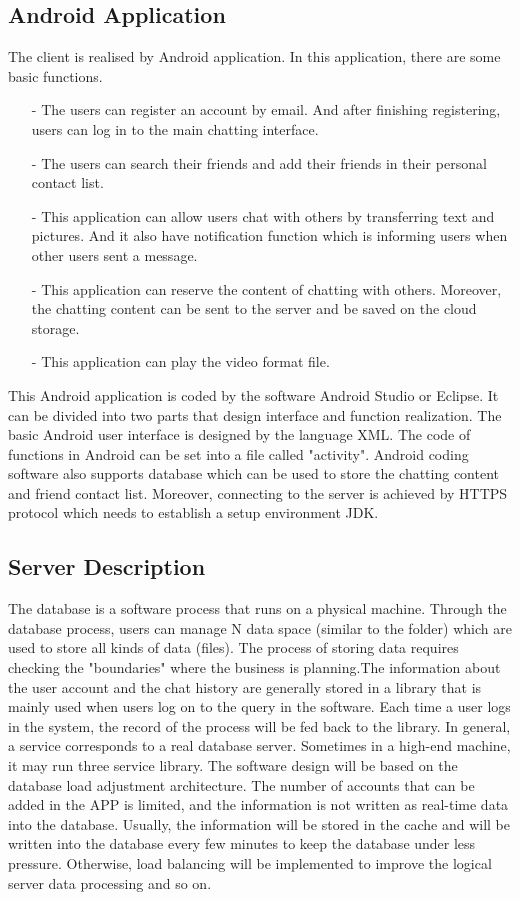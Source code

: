 \documentclass{article}
\begin{document}
\subsection{Android Application}

The client is realised by Android application. In this application, there are some basic functions. 
\begin{itemize}
\item[-] The users can register an account by email. And after finishing registering, users can log in to the main chatting interface.
\item[-] The users can search their friends and add their friends in their personal contact list.
\item[-] This application can allow users chat with others by transferring text and pictures. And it also have notification function which is informing users when other users sent a message.
\item[-] This application can reserve the content of chatting with others. Moreover, the chatting content can be sent to the server and be saved on the cloud storage.
\item[-] This application can play the video format file.
\end{itemize} 
This Android application is coded by the software Android Studio or Eclipse. It can be divided into two parts that design interface and function realization. The basic Android user interface is designed by the language XML. The code of functions in Android can be set into a file called "activity".\cite{bib4} Android coding software also supports database which can be used to store the chatting content and friend contact list. Moreover, connecting to the server is achieved by HTTPS protocol which needs to establish a setup environment JDK.\cite{bib1} 


\subsection{Server Description}

The database is a software process that runs on a physical machine. Through the database process, users can manage N data space (similar to the folder) which are used to store all kinds of data (files). The process of storing data requires checking the "boundaries" where the business is planning.The information about the user account and the chat history are generally stored in a library that is mainly used when users log on to the query in the software. Each time a user logs in the system, the record of the process will be fed back to the library. In general, a service corresponds to a real database server. Sometimes in a high-end machine, it may run three service library. The software design will be based on the database load adjustment architecture. The number of accounts that can be added in the APP is limited, and the information is not written as real-time data into the database. Usually, the information will be stored in the cache and will be written into the database every few minutes to keep the database under less pressure. Otherwise, load balancing will be implemented to improve the logical server data processing and so on.
\end{document}
